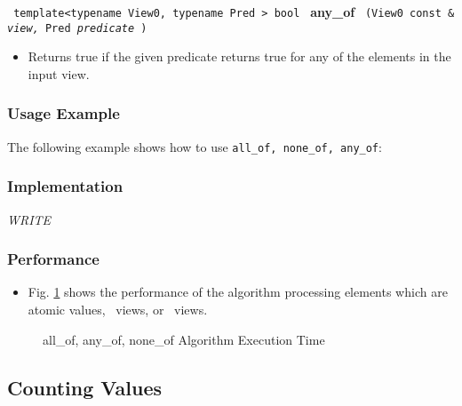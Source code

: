 \noindent
\texttt{%
template<typename View0, typename Pred >
\newline
bool 
}
\newline
\textbf{any\_of}%
\texttt{%
(View0 const \&
\textit{view,}%
Pred 
\textit{predicate}%
)
}

\begin{itemize}
\item
Returns true if the given predicate returns true for any of the elements in the input view. 
\end{itemize}

\subsubsection{Usage Example} %

The following example shows how to use \texttt{all\_of, none\_of, any\_of}:

 
\subsubsection{Implementation} %

\textit{WRITE}

\subsubsection{Performance} %

\begin{itemize}
\item
Fig. \ref{fig:bool-count-alg-exec-exper}
shows the performance of the algorithm processing
elements which are atomic values, \stl\ views, or \stapl\ views.
\end{itemize}

\begin{figure}[p]
\caption{all\_of, any\_of, none\_of Algorithm Execution Time}
\label{fig:bool-count-alg-exec-exper}
\end{figure}

 
\subsection{Counting Values} \label{sec-sumry-diff_type}

